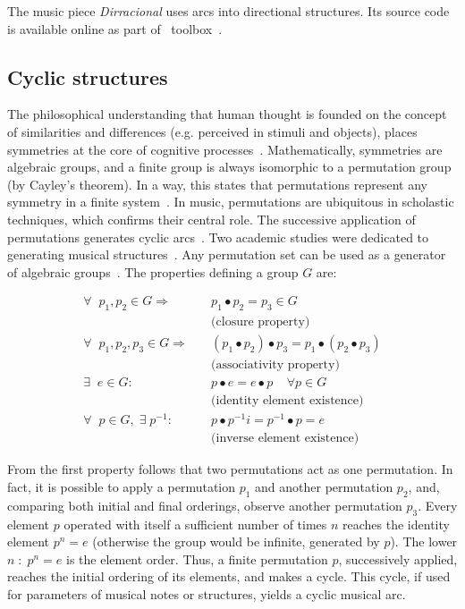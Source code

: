 The music piece \emph{Dirracional} uses arcs into directional structures. Its source code is available online as part
of \massa\ toolbox~\cite{MASSA}.

\subsection{Cyclic structures}\label{estCic}

The philosophical understanding that human thought is founded on the concept of similarities and differences (e.g. perceived in stimuli and objects), places symmetries
at the core of cognitive processes~\cite{Deleuze}. Mathematically, symmetries are algebraic groups, and a finite group is always isomorphic to a permutation
group (by Cayley's theorem). 
In a way, this states that permutations represent any symmetry in a
finite system~\cite{gruposFascination}.
In music, permutations are ubiquitous in scholastic techniques,
 which confirms their central role. 
The successive application of permutations generates cyclic arcs~\cite{change,Zamacois,permMusic}. Two academic studies were dedicated to generating musical structures~\cite{figgusOriginal, figgusEspacializacao}. Any permutation set can be used as a generator of algebraic groups~\cite{permMusic}.
The properties defining a group $G$ are:

\begin{equation}\label{eq:groups}
\begin{split}
\forall \;\; p_1,p_2 \in G \Rightarrow  \quad   & p_1 \bullet p_2  = p_3 \in G \\ 
     & \text{(closure property)} \\
\forall \;\; p_1,p_2,p_3 \in G \Rightarrow \quad & (p_1\bullet p_2)\bullet p_3  = p_1\bullet (p_2\bullet p_3) \\
     & \text{(associativity property)} \\
\exists \;\; e \in G :                  \quad    & p \bullet e  = e \bullet p \;\;\;\; \forall p \in G  \\ 
     &  \text{(identity element existence)} \\
\forall \;\; p \in G, \;\exists\; p^{-1} :\quad  &  p\bullet p^{-1}i =p^{-1}\bullet p = e \\
     &  \text{(inverse element existence)}
\end{split}
\end{equation}

From the first property follows that two permutations act as one permutation. In fact, it is possible to apply a
permutation $p_1$ and another permutation $p_2$, and, comparing both initial and final orderings, observe another permutation $p_3$. Every element $p$ operated with itself a sufficient number of times $n$ reaches the identity element $p^n=e$ (otherwise the group would be infinite, generated
by $p$). The lower $n\;:\;p^n=e$ is the element order. Thus, a finite
permutation $p$, successively applied, reaches the initial ordering of its
elements, and makes a cycle. This cycle, if used for parameters of musical notes or structures,
yields a cyclic musical arc.

